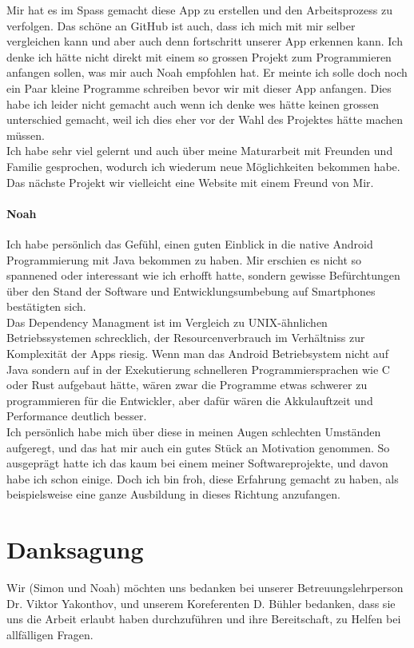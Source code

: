 \documentclass[a4paper,11pt]{article}
\begin{document}
Mir hat es im Spass gemacht diese App zu erstellen und den Arbeitsprozess zu verfolgen. Das schöne an GitHub ist auch, dass ich mich mit mir selber vergleichen kann und aber auch denn 
fortschritt unserer App erkennen kann. Ich denke ich hätte nicht direkt mit einem so grossen Projekt zum Programmieren anfangen sollen, was mir auch Noah empfohlen hat. Er meinte ich solle 
doch noch ein Paar kleine Programme schreiben bevor wir mit dieser App anfangen. Dies habe ich leider nicht gemacht auch wenn ich denke wes hätte keinen grossen unterschied gemacht,
weil ich dies eher vor der Wahl des Projektes hätte machen müssen. \\

Ich habe sehr viel gelernt und auch über meine Maturarbeit mit Freunden und Familie gesprochen, wodurch ich wiederum neue Möglichkeiten bekommen habe. Das nächste Projekt wir vielleicht eine 
Website mit einem Freund von Mir.


\paragraph{Noah}
Ich habe persönlich das Gefühl, einen guten Einblick in die native Android Programmierung mit Java bekommen zu haben. Mir erschien es nicht so spannened oder interessant wie ich erhofft hatte, sondern gewisse Befürchtungen über den Stand der Software und Entwicklungsumbebung auf Smartphones bestätigten sich.\\

Das Dependency Managment ist im Vergleich zu UNIX-ähnlichen Betriebssystemen schrecklich, der Resourcenverbrauch im Verhältniss zur Komplexität der Apps riesig. Wenn man das Android Betriebsystem nicht auf Java sondern auf in der Exekutierung schnelleren Programmiersprachen wie C oder Rust aufgebaut hätte, wären zwar die Programme etwas schwerer zu programmieren für die Entwickler, aber dafür wären die Akkulauftzeit und Performance deutlich besser.\\

Ich persönlich habe mich über diese in meinen Augen schlechten Umständen aufgeregt, und das hat mir auch ein gutes Stück an Motivation genommen. So ausgeprägt hatte ich das kaum bei einem meiner Softwareprojekte, und davon habe ich schon einige. Doch ich bin froh, diese Erfahrung gemacht zu haben, als beispielsweise eine ganze Ausbildung in dieses Richtung anzufangen.

\section{Danksagung}
Wir (Simon und Noah) möchten uns bedanken bei unserer Betreuungslehrperson Dr. Viktor Yakonthov, und unserem Koreferenten D. Bühler bedanken, dass sie uns die Arbeit erlaubt haben durchzuführen und ihre Bereitschaft, zu Helfen bei allfälligen Fragen.
\end{document}
